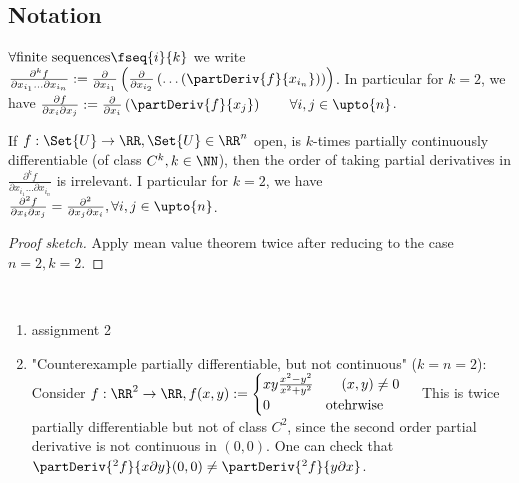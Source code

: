 \subsection*{Notation}
$\forall \text{finite sequences}\fseq{i}{k}$ we write $\frac{\partial^k f}{\partial x_{i_1}\ldots\partial x_{i_n}}:=\frac{\partial}{\partial x_{i_1}}\left(\frac{\partial}{\partial x_{i_2}}\left(\ldots\left(\partDeriv{f}{x_{i_n}}\right)\right)\right)$.
In particular for $k=2$, we have $\frac{\partial f}{\partial x_i\partial x_j}:=\frac{\partial}{\partial x_i}\left(\partDeriv{f}{x_j}\right)\qquad\forall i, j\in\upto{n}$. 

\begin{prop}
  If $f:\Set{U}\to\RR, \Set{U}\in\RR^n$ open, is $k$-times partially continuously differentiable (of class $C^k, k\in\NN$), then the order of taking partial derivatives in $\frac{\partial^k f}{\partial x_{i_1}\ldots\partial x_{i_n}}$ is irrelevant. I particular for $k=2$, we have $\frac{\partial^2 f}{\partial x_i\partial x_j}=\frac{\partial^2}{\partial x_j\partial x_i}, \forall i,j\in\upto{n}$.
\end{prop}
\begin{proof}[Proof sketch]
  Apply mean value theorem twice after reducing to the case $n=2, k=2$.
\end{proof}
\begin{exam}\ 
  \begin{enumerate}
  	\item assignment 2
  	\item "Counterexample partially differentiable, but not continuous" ($k=n=2$):
  	Consider $f:\RR^2\to\RR, f(x,y):=\begin{cases}xy\frac{x^2-y^2}{x^2+y^2}\qquad(x,y)\neq 0\\0\qquad\qquad\text{otehrwise}\end{cases}$
  	This is twice partially differentiable but not of class $C^2$, since the second order partial derivative is not continuous in $(0,0)$. One can check that $\partDeriv{^2f}{x\partial y}(0,0)\neq \partDeriv{^2f}{y\partial x}$.
  \end{enumerate}
\end{exam}